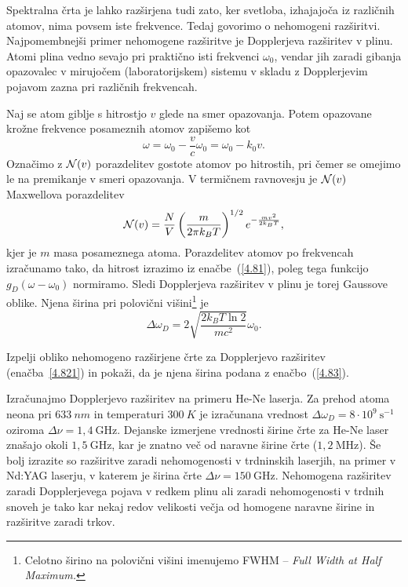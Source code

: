 Spektralna črta je lahko razširjena tudi zato, ker svetloba, izhajajoča iz različnih
atomov, nima povsem iste frekvence. Tedaj govorimo o nehomogeni 
razširitvi.
Najpomembnejši primer nehomogene razširitve je Dopplerjeva 
 razširitev v plinu. 
Atomi plina vedno sevajo pri praktično isti frekvenci $\omega_0$, vendar jih zaradi gibanja
opazovalec v mirujočem (laboratorijskem) sistemu v skladu z Dopplerjevim pojavom 
zazna pri različnih frekvencah. 

Naj se atom giblje s hitrostjo $v$ glede na smer opazovanja. Potem opazovane krožne 
frekvence posameznih atomov zapišemo kot  
\begin{equation}
\omega=\omega_{0}-\frac{v}{c}\omega_{0}=\omega_{0}-k_{0}v.
\label{4.81}
\end{equation}
Označimo z ${\cal N}(v)$ porazdelitev gostote atomov po hitrostih, pri čemer se omejimo 
le na premikanje v smeri opazovanja. V termičnem ravnovesju je ${\cal N}(v)$
Maxwellova porazdelitev
\begin{equation}
{\cal N}(v)=\frac{N}{V}\left(\frac{m}{2\pi k_{B}T}\right)^{1/2}e^{-\frac{mv^{2}}{2k_{B}T}},
\label{4.82}
\end{equation}
kjer je $m$ masa posameznega atoma.
Porazdelitev atomov po frekvencah izračunamo tako, da hitrost izrazimo
iz enačbe~(\ref{4.81}), poleg tega funkcijo $g_{D}(\omega-\omega_0)$
normiramo. Sledi
Dopplerjeva razširitev v plinu je torej Gaussove oblike.
Njena širina pri polovični 
višini\footnote{Celotno širino na polovični višini imenujemo FWHM -- \it{Full Width at Half Maximum}.} je
\begin{equation} 
\Delta\omega_{D}=2 \sqrt{\frac{2k_{B}T \ln 2}{mc^{2}}}\omega_{0}.
\label{4.83}
\end{equation}
\begin{definition}
Izpelji obliko nehomogeno razširjene črte za Dopplerjevo razširitev (enačba~\ref{4.821})
in pokaži, da je njena širina podana z enačbo~(\ref{4.83}).
\end{definition}

Izračunajmo Dopplerjevo razširitev na primeru He-Ne laserja. Za prehod
atoma neona pri $633~\si{nm}$ in temperaturi $300~\si{K}$ je izračunana vrednost
$\Delta\omega_{D}=8\cdot10^{9}~\si{\second}^{-1}$ oziroma $\Delta \nu = 1,4~\si{\giga\hertz}$. 
Dejanske izmerjene vrednosti širine črte za He-Ne laser 
znašajo okoli $1,5~\si{\giga\hertz}$, kar je znatno več od naravne širine
črte ($1,2~\si{\mega\hertz}$). Še bolj izrazite so razširitve zaradi nehomogenosti
v trdninskih laserjih, na primer v Nd:YAG laserju, v katerem 
je širina črte $\Delta \nu= 150~\si{\giga\hertz}$. Nehomogena razširitev zaradi Dopplerjevega pojava v 
redkem plinu ali zaradi nehomogenosti v trdnih snoveh je tako kar nekaj redov velikosti 
večja od homogene naravne širine in razširitve zaradi trkov.

